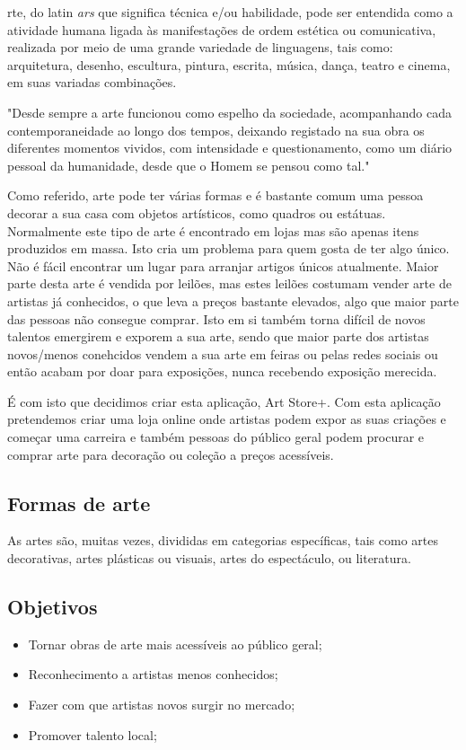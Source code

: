\documentclass[conference]{IEEEtran}
\begin{document}
rte, do latin \textit{ars} que significa técnica e/ou 
habilidade, pode ser entendida como a atividade humana ligada às 
manifestações de ordem estética ou comunicativa, realizada 
por meio de uma grande variedade de linguagens, tais como: 
arquitetura, desenho, escultura, 
pintura, escrita, música, dança, teatro e cinema, em suas 
variadas combinações. \cite{wikiarte}

"Desde sempre a arte funcionou como espelho da sociedade, 
acompanhando cada contemporaneidade ao longo dos tempos, 
deixando registado na sua obra os diferentes 
momentos vividos, com intensidade e questionamento, como 
um diário pessoal da humanidade, 
desde que o Homem se pensou como tal." \cite{patrimonio}

Como referido, arte pode ter várias formas e é bastante comum 
uma pessoa decorar a sua casa com objetos artísticos, como 
quadros ou estátuas. Normalmente este tipo de arte é encontrado 
em lojas mas são apenas itens produzidos em massa. Isto cria um 
problema para quem gosta de ter algo único. Não é fácil encontrar 
um lugar para arranjar artigos únicos atualmente. Maior parte 
desta arte é vendida por leilões, mas estes leilões costumam 
vender arte de artistas já conhecidos, o que leva a preços 
bastante elevados, algo que maior parte das pessoas não consegue 
comprar. Isto em si também torna difícil de novos talentos emergirem 
e exporem a sua arte, sendo que maior parte dos artistas novos/menos 
conehcidos vendem a sua arte em feiras ou pelas redes sociais ou 
então acabam por doar para exposições, nunca recebendo exposição 
merecida.

É com isto que decidimos criar esta aplicação, Art Store+. Com 
esta aplicação pretendemos criar uma loja online onde artistas 
podem expor as suas criações e começar uma carreira e também 
pessoas do público geral podem procurar e comprar arte para 
decoração ou coleção a preços acessíveis.


\subsection{Formas de arte}
As artes são, muitas vezes, divididas em categorias específicas, 
tais como artes decorativas, 
artes plásticas ou visuais, artes do espectáculo, ou literatura.

\subsection{Objetivos}
\begin{itemize}
    \item Tornar obras de arte mais acessíveis ao público geral;
    \item Reconhecimento a artistas menos conhecidos;
    \item Fazer com que artistas novos surgir no mercado;
    \item Promover talento local;
\end{itemize}
\end{document}

